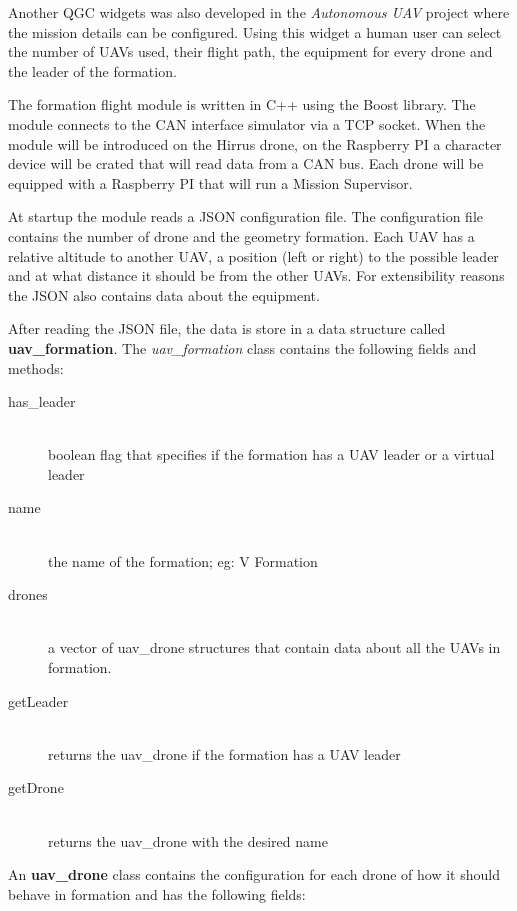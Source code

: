Another QGC widgets was also developed in the \textit{Autonomous UAV} project
where the mission details can be configured. Using this widget a human user
can select the number of UAVs used, their flight path, the equipment for every
drone and the leader of the formation.

The formation flight module is written in C++ using the Boost library. The 
module connects to the CAN interface simulator via a TCP socket. When the module
will be introduced on the Hirrus drone, on the Raspberry PI a character device
will be crated that will read data from a CAN bus. Each drone will be equipped
with a Raspberry PI that will run a Mission Supervisor.

At startup the module reads a JSON configuration file. The configuration
file contains the number of drone and the geometry formation. Each UAV has
a relative altitude to another UAV, a position (left or right) to the possible 
leader and at what distance it should be from the other UAVs. For extensibility
reasons the JSON also contains data about the equipment.

After reading the JSON file, the data is store in a data structure called 
\textbf{uav_formation}. The \textit{uav_formation} class contains the following fields
and methods:

\begin{description}
\item [has_leader] \hfill \\ boolean flag that specifies if the formation has a UAV leader
or a virtual leader
\item [name] \hfill \\ the name of the formation; eg: V Formation
\item [drones] \hfill \\ a vector of uav_drone structures that contain data about all the
UAVs in formation.
\item [getLeader] \hfill \\ returns the uav_drone if the formation has a UAV leader
\item [getDrone] \hfill \\ returns the uav_drone with the desired name
\end{description}

An \textbf{uav_drone} class contains the configuration for each drone of how it
should behave in formation and has the following fields:

